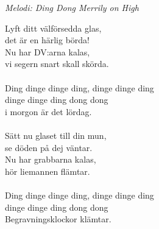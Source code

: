 {\footnotesize\textit{Melodi: Ding Dong Merrily on High}}\par
\vspace{10pt}
Lyft ditt välförsedda glas,\\
det är en härlig börda!\\
Nu har DV:arna kalas,\\
vi segern snart skall skörda.\\
\\
Ding dinge dinge ding, dinge dinge ding\\
dinge dinge ding dong dong\\
i morgon är det lördag.\\
\\
Sätt nu glaset till din mun,\\
se döden på dej väntar.\\
Nu har grabbarna kalas,\\
hör liemannen flämtar.\\
\\
Ding dinge dinge ding, dinge dinge ding\\
dinge dinge ding dong dong\\
Begravningsklockor klämtar.
